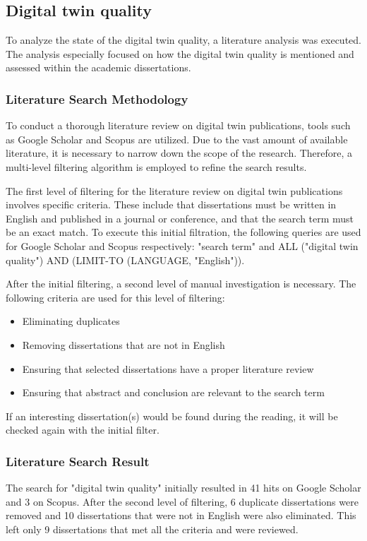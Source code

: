\documentclass{llncs}
\begin{document}
    \subsection{Digital twin quality}
    To analyze the state of the digital twin quality, a literature analysis was executed. 
    The analysis especially focused on how the digital twin quality is mentioned and assessed within the academic dissertations.

    \subsubsection*{Literature Search Methodology}
    To conduct a thorough literature review on digital twin publications, tools such as Google Scholar and Scopus are utilized. Due to the vast amount of available literature, it is necessary to narrow down the scope of the research. 
    Therefore, a multi-level filtering algorithm is employed to refine the search results.

    The first level of filtering for the literature review on digital twin publications involves specific criteria. These include that dissertations must be written in English and 
    published in a journal or conference, and that the search term must be an exact match. To execute this initial filtration, 
    the following queries are used for Google Scholar and Scopus respectively: "search term" and ALL ("digital twin quality") AND (LIMIT-TO (LANGUAGE, "English")).

    After the initial filtering, a second level of manual investigation is necessary. The following criteria are used for this level of filtering:    
    \begin{itemize}
        \item  Eliminating duplicates
        \item  Removing dissertations that are not in English
        \item  Ensuring that selected dissertations have a proper literature review
        \item  Ensuring that abstract and conclusion are relevant to the search term
    \end{itemize}
    If an interesting dissertation(s) would be found during the reading, it will be checked again with the initial filter.
    \subsubsection*{Literature Search Result}
    The search for "digital twin quality" initially resulted in 41 hits on Google Scholar and 3 on Scopus. 
    After the second level of filtering, 6 duplicate dissertations were removed and 10 dissertations that were not in English were also eliminated. 
    This left only 9 dissertations that met all the criteria and were reviewed.
\end{document}
